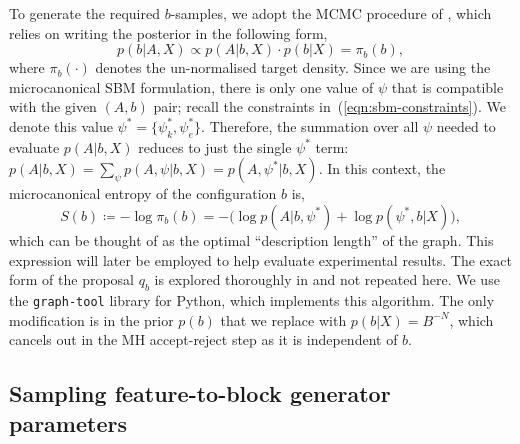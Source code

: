 To generate the required $b$-samples, we adopt the MCMC
procedure of
\cite{Peixoto-MCMC},
which relies on writing the posterior in the following form,
%
\begin{equation}
	p(b | A, X) \propto p(A | b, X) \cdot p(b | X) = \pi_b(b),
\end{equation}
%
where $\pi_b(\cdot)$ denotes the un-normalised target density.
Since we are using the microcanonical SBM formulation, there is only one 
value of $\psi$ that is compatible with the given $(A, b)$ pair;
recall the constraints in~(\ref{eqn:sbm-constraints}).
We denote this value $\psi^* = \{\psi_k^*, \psi_e^*\}$. Therefore, 
the summation over all $\psi$ needed to evaluate $p(A | b, X)$ reduces to just the single $\psi^*$ term:
$p(A | b, X) = \sum_{\psi} \nolimits p(A , \psi | b, X) = p(A, \psi^* | b, X)$.
In
this context, the microcanonical entropy of the configuration $b$
is,
%
\begin{equation}
	S(b) \coloneqq - \log \pi_b(b) = - \Big( \log p(A | b, \psi^*) + \log p(\psi^*, b | X) \Big),
	\label{eqn:dl-form}
\end{equation}
%
which can be thought of as the optimal
``description length'' of the graph. 
This expression will later be employed 
to help evaluate experimental results. 
The exact form of the proposal $q_b$ is explored thoroughly in
\cite{Peixoto-MCMC} and not repeated here. We use the \verb*|graph-tool| \cite{peixoto_graph-tool_2014}
library for Python, which implements this algorithm.
The only modification is in 
the prior $p(b)$ that we replace with $p(b|X)=B^{-N}$, 
which cancels out in the MH accept-reject step as it is independent of $b$.

\subsection{Sampling feature-to-block generator parameters}
\label{s:sfb}

